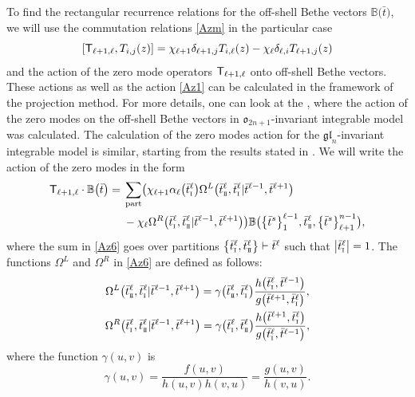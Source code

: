 \documentclass[10pt,a4paper]{amsart}
\newcommand{\so}{\scriptscriptstyle \rm I}
\newcommand{\st}{\scriptscriptstyle \rm I\hspace{-1pt}I}
\newcommand{\bt}{{\bar t}}
\theoremstyle{definition}
\def\BB{{\mathbb{B}}}
\def\r#1{\eqref{#1}}
\def\sT{{\sf T}}
\def\vk{\chi}
\def\Oml{\Omega^L}
\def\Omr{\Omega^R}
\begin{document}
To find the rectangular recurrence relations for the off-shell Bethe vectors
$\BB\bigl(\bt\bigr)$, we will use the commutation relations \r{Azm} in the particular case
\begin{equation}\label{Az5}
[\sT_{\ell+1,\ell},T_{i,j}(z)]=\vk_{\ell+1} \delta_{\ell+1,j} T_{i,\ell}(z)-
\vk_{\ell} \delta_{\ell,i} T_{\ell+1,j}(z)
\end{equation}
and the action of the zero mode operators $\sT_{\ell+1,\ell}$ onto off-shell Bethe vectors.
These actions as well as the action \r{Az1} can be calculated in the framework of the
projection method. For more details, one can look at the \cite[Section~4.1]{LP2},
where the action of the zero modes on the off-shell Bethe vectors
in $\mathfrak{o}_{2n+1}$-invariant integrable model was calculated.
The calculation of the zero modes action for
the $\mathfrak{gl}_{n}$-invariant integrable model is similar, starting from the results stated in \cite{HLPRS17}.
We will write the action of the zero modes in the form
\begin{align}
\sT_{\ell+1,\ell}\cdot\BB\bigl(\bt\bigr) ={}&\sum_{\rm part}\bigl(\vk_{\ell+1}
\alpha_\ell\bigl(\bt^\ell_{\so}\bigr) \Oml\bigl(\bt^\ell_{\st},\bt^\ell_{\so}|\bt^{\ell-1},\bt^{\ell+1}\bigr)\nonumber\\
&- \vk_\ell \Omr\bigl(\bt^\ell_{\so},\bt^\ell_{\st}|\bt^{\ell-1},\bt^{\ell+1}\bigr)\bigr)
\BB\bigl(\bigl\{\bt^s\bigr\}_{1}^{\ell-1},\bt^\ell_{\st},\bigl\{\bt^s\bigr\}_{\ell+1}^{n-1}\bigr) ,\label{Az6}
\end{align}
where the sum in \r{Az6} goes over
partitions $ \bigl\{\bt^\ell_{\so},\bt^\ell_{\st}\bigr\}\vdash \bt^\ell$ such that
$\big|\bt^\ell_{\so}\big|=1$.
The functions $\Oml$ and $\Omr$ in \r{Az6}
are defined as follows:
\begin{gather}
\Oml\bigl(\bt^\ell_{\st},\bt^\ell_{\so}|\bt^{\ell-1},\bt^{\ell+1}\bigr)=\gamma\bigl(\bt^\ell_{\st},\bt^\ell_{\so}\bigr)
 \frac{h\bigl(\bt^\ell_{\so},\bt^{\ell-1}\bigr)}{g\bigl(\bt^{\ell+1},\bt^\ell_{\so}\bigr)},\nonumber\\
\Omr\bigl(\bt^\ell_{\so},\bt^\ell_{\st}|\bt^{\ell-1},\bt^{\ell+1}\bigr)=
\gamma\bigl(\bt^\ell_{\so},\bt^\ell_{\st}\bigr)
 \frac{h\bigl(\bt^{\ell+1},\bt^\ell_{\so}\bigr)}{g\bigl(\bt^\ell_{\so},\bt^{\ell-1}\bigr)} ,\label{Az7}
\end{gather}
where the function $\gamma(u,v)$ is
\begin{equation*}
\gamma(u,v)=\frac{f(u,v)}{h(u,v)h(v,u)}=\frac{g(u,v)}{h(v,u)} .
\end{equation*}
\end{document}
